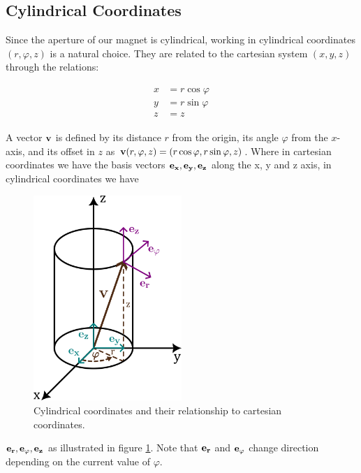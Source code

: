 \subsection{Cylindrical Coordinates}
Since the aperture of our magnet is cylindrical, working in cylindrical
coordinates $(r, \varphi, z)$ is a natural choice. They are related to the cartesian
system $(x, y, z)$ through the relations:

\begin{align}
    \begin{split}
        x &= r\cos \varphi \\
        y &= r\sin \varphi \\
        z &= z
    \end{split}
\end{align}

A vector $\vb{v}$ is defined by its distance $r$ from the origin, its
angle $\varphi$ from the $x$-axis, and its offset in $z$ as
$\vb{v}(r, \varphi, z)  = (r\cos \varphi, r\sin \varphi, z)$.
Where in cartesian coordinates we have
the basis vectors $\vb{e_x}, \vb{e_y}, \vb{e_z}$
along the x, y and z axis, in cylindrical coordinates we have

\begin{figure}
    \includegraphics[width=0.5\textwidth]{figs/cylcoords}
    \caption{Cylindrical coordinates and their relationship to cartesian coordinates.}
    \label{fig:cylcoords}
\end{figure}

$\vb{e_r}, \vb{e_\varphi}, \vb{e_z}$ as illustrated in
figure \ref{fig:cylcoords}. Note that $\vb{e_r}$ and $\vb{e_\varphi}$
change direction depending on the current value of $\varphi$.

